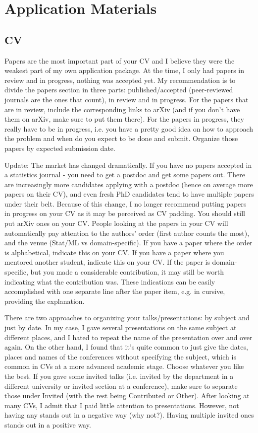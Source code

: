 \documentclass{article}
\begin{document}
\section{Application Materials}

\subsection{CV}

Papers are the most important part of your CV and I believe they were the weakest part of my own application package. At the time, I only had papers in review and in progress, nothing was accepted yet. My recommendation is to divide the papers section in three parts: published/accepted (peer-reviewed journals are the ones that count), in review and in progress. For the papers that are in review, include the corresponding links to arXiv (and if you don't have them on arXiv, make sure to put them there). For the papers in progress, they really have to be in progress, i.e. you have a pretty good idea on how to approach the problem and when do you expect to be done and submit. Organize those papers by expected submission date.

{\color{red} Update: The market has changed dramatically. If you have no papers accepted in a statistics journal - you need to get a postdoc and get some papers out. There are increasingly more candidates applying with a postdoc (hence on average more papers on their CV), and even fresh PhD candidates tend to have multiple papers under their belt. Because of this change, I no longer recommend putting papers in progress on your CV as it may be perceived as CV padding. You should still put arXiv ones on your CV. People looking at the papers in your CV will automatically pay attention to the authors' order (first author counts the most), and the venue (Stat/ML vs domain-specific). If you have a paper where the order is alphabetical, indicate this on your CV. If you have a paper where you mentored another student, indicate this on your CV. If the paper is domain-specific, but you made a considerable contribution, it may still be worth indicating what the contribution was. These indications can be easily accomplished with one separate line after the paper item, e.g. in cursive, providing the explanation.}

There are two approaches to organizing your talks/presentations: by subject and just by date. In my case, I gave several presentations on the same subject at different places, and I hated to repeat the name of the presentation over and over again. On the other hand, I found that it's quite common to just give the dates, places and names of the conferences without specifying the subject, which is common in CVs at a more advanced academic stage. Choose whatever you like the best. If you gave some invited talks (i.e. invited by the department in a different university or invited section at a conference), make sure to separate those under Invited (with the rest being Contributed or Other). {\color{red} After looking at many CVs, I admit that I paid little attention to presentations. However, not having any stands out in a negative way (why not?). Having multiple invited ones stands out in a positive way.}
\end{document}
